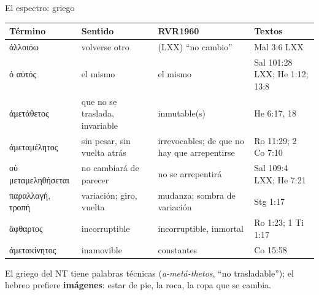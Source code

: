 \documentclass[hyperref={bookmarks=false},aspectratio=169]{beamer}
\newcommand{\grc}[1]{\foreignlanguage{ancientgreek}{#1}}
\newcommand{\destacar}[1]{\textbf{\textcolor{azul}{#1}}}
\begin{document}
\begin{frame}{El espectro: griego}
\scriptsize\renewcommand{\arraystretch}{1.12}
\begin{tabular}{@{}>{\RaggedRight\arraybackslash}p{2.6cm}>{\RaggedRight\arraybackslash}p{3.2cm}>{\RaggedRight\arraybackslash}p{2.5cm}>{\RaggedRight\arraybackslash}p{3.4cm}@{}}
\toprule
\textbf{Término} & \textbf{Sentido} & \textbf{RVR1960} & \textbf{Textos} \\ \midrule
\grc{ἀλλοιόω} & volverse otro & (LXX) ``no cambio'' & Mal 3:6 LXX \\
\grc{ὁ αὐτός} & el mismo & el mismo & Sal 101:28 LXX; He 1:12; 13:8 \\
\grc{ἀμετάθετος} & que no se traslada, invariable & inmutable(s) & He 6:17, 18 \\
\grc{ἀμεταμέλητος} & sin pesar, sin vuelta atrás & irrevocables; de que no hay que arrepentirse & Ro 11:29; 2 Co 7:10 \\
\grc{οὐ μεταμεληθήσεται} & no cambiará de parecer & no se arrepentirá & Sal 109:4 LXX; He 7:21 \\
\grc{παραλλαγή}, \grc{τροπή} & variación; giro, vuelta & mudanza; sombra de variación & Stg 1:17 \\
\grc{ἄφθαρτος} & incorruptible & incorruptible, inmortal & Ro 1:23; 1 Ti 1:17 \\
\grc{ἀμετακίνητος} & inamovible & constantes & 1 Co 15:58 \\
\bottomrule
\end{tabular}\par\medskip
\small\RaggedRight El griego del NT tiene palabras técnicas (\emph{a-metá-thetos}, ``no trasladable''); el hebreo prefiere \destacar{imágenes}: estar de pie, la roca, la ropa que se cambia.
\end{frame}
\end{document}
